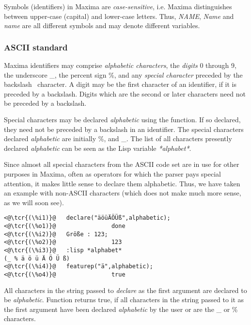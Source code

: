 \documentclass[../Maxima_Workbook.tex]{subfiles}
\begin{document}
Symbols (identifiers) in Maxima are \emph{case-sensitive}, i.e. Maxima distinguishes between upper-case (capital) and lower-case letters. Thus, \emph{NAME}, \emph{Name} and \emph{name} are all different symbols and may denote different variables.

\subsubsection{ASCII standard}

Maxima identifiers may comprise \emph{alphabetic characters}, the \emph{digits} 0 through 9, the underscore \_, the percent sign \%, and any \emph{special character} preceded by the backslash \ character. A digit may be the first character of an identifier, if it is preceded by a backslash. Digits which are the second or later characters need not be preceded by a backslash.

\lzz {} \hfill \tcr{[property]}

\lz Special characters may be declared \emph{alphabetic} using the  function. If so declared, they need not be preceded by a backslash in an identifier. The special characters declared \emph{alphabetic} are initially \%, and \_. The list of all characters presently declared \emph{alphabetic} can be seen as the Lisp variable \emph{*alphabet*}. 

\lz Since almost all special characters from the ASCII code set are in use for other purposes in Maxima, often as operators for which the parser pays special attention, it makes little sense to declare them alphabetic. Thus, we have taken an example with non-ASCII characters (which does not make much more sense, as we will soon see).

\lz \begin{lstlisting}
<@\tcr{(\%i1)}@   declare("äöüÄÖÜß",alphabetic);
<@\tcr{(\%o1)}@			       done
<@\tcr{(\%i2)}@   Größe : 123;
<@\tcr{(\%o2)}@			       123
<@\tcr{(\%i3)}@   :lisp *alphabet*
(_ % ä ö ü Ä Ö Ü ß)
<@\tcr{(\%i4)}@   featurep("ä",alphabetic);
<@\tcr{(\%o4)}@			       true
\end{lstlisting}

All characters in the string passed to \emph{declare} as the first argument are declared to be \emph{alphabetic}. Function  returns true, if all characters in the string passed to it as the first argument have been declared \emph{alphabetic} by the user or are the \_ or \% characters.
\end{document}
